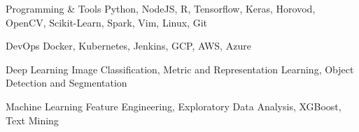 

\begin{cvskills}

  \cvskill
    {Programming \& Tools} %
    {Python, NodeJS, R, Tensorflow, Keras, Horovod, OpenCV, Scikit-Learn, Spark, Vim, Linux, Git} %

  \cvskill
    {DevOps} %
    {Docker, Kubernetes, Jenkins, GCP, AWS, Azure} %

  \cvskill
    {Deep Learning} %
    {Image Classification, Metric and Representation Learning, Object Detection and Segmentation} %

  \cvskill
    {Machine Learning} %
    {Feature Engineering, Exploratory Data Analysis, XGBoost, Text Mining} %

\end{cvskills}
